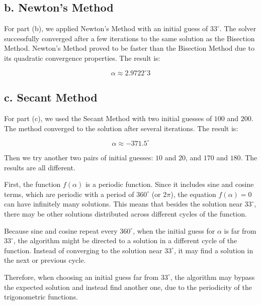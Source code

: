 \documentclass[a4paper]{article}
\begin{document}
\subsection* {b. Newton's Method}
For part (b), we applied Newton's Method with an initial guess of \( 33^\circ \). The solver successfully converged after a few iterations to the same solution as the Bisection Method. Newton's Method proved to be faster than the Bisection Method due to its quadratic convergence properties. The result is:

\[
\alpha \approx 2.9722^\circ3
\]

\subsection* {c. Secant Method}
For part (c), we used the Secant Method with two initial guesses of \( 100 \) and \( 200 \). The method converged to the solution after several iterations. The result is:

\[
\alpha \approx -371.5^\circ
\]

Then we try another two pairs of initial guesses: \( 10 \) and \( 20 \), and \( 170 \) and \( 180 \). The results are all different. 

First, the function \( f(\alpha) \) is a periodic function. Since it includes sine and cosine terms, which are periodic with a period of \( 360^\circ \) (or \( 2\pi \)), the equation \( f(\alpha) = 0 \) can have infinitely many solutions. This means that besides the solution near \( 33^\circ \), there may be other solutions distributed across different cycles of the function.

Because sine and cosine repeat every \( 360^\circ \), when the initial guess for \( \alpha \) is far from \( 33^\circ \), the algorithm might be directed to a solution in a different cycle of the function. Instead of converging to the solution near \( 33^\circ \), it may find a solution in the next or previous cycle.

Therefore, when choosing an initial guess far from \( 33^\circ \), the algorithm may bypass the expected solution and instead find another one, due to the periodicity of the trigonometric functions.
\end{document}
